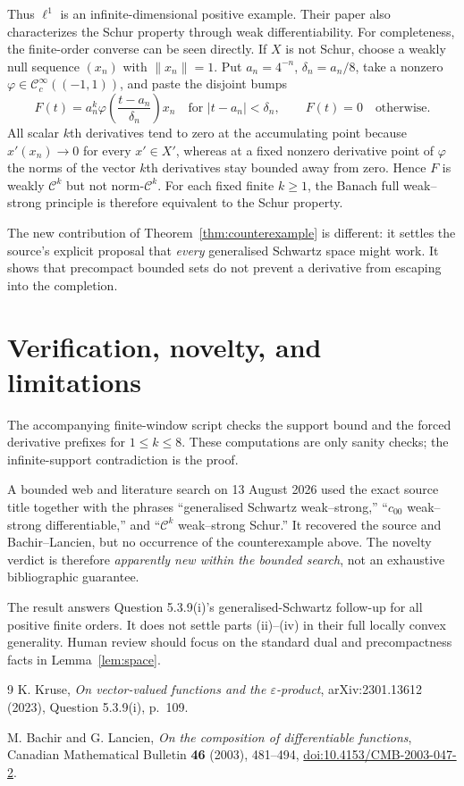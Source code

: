 \documentclass[10pt]{article}
\newcommand{\Ck}{\mathcal C}
\begin{document}
Thus $\ell^1$ is an infinite-dimensional positive example. Their paper also
characterizes the Schur property through weak differentiability. For
completeness, the finite-order converse can be seen directly. If $X$ is not
Schur, choose a weakly null sequence $(x_n)$ with $\|x_n\|=1$. Put
$a_n=4^{-n}$, $\delta_n=a_n/8$, take a nonzero
$\varphi\in\Ck_c^\infty((-1,1))$, and paste the disjoint bumps
\[
 F(t)=a_n^k\varphi\!\left(\frac{t-a_n}{\delta_n}\right)x_n
 \quad\text{for }|t-a_n|<\delta_n,
 \qquad F(t)=0\quad\text{otherwise}.
\]
All scalar $k$th derivatives tend to zero at the accumulating point because
$x'(x_n)\to0$ for every $x'\in X'$, whereas at a fixed nonzero derivative
point of $\varphi$ the norms of the vector $k$th derivatives stay bounded
away from zero. Hence $F$ is weakly $\Ck^k$ but not norm-$\Ck^k$. For each
fixed finite $k\geq1$, the Banach full weak--strong principle is therefore
equivalent to the Schur property.

The new contribution of Theorem~\ref{thm:counterexample} is different: it
settles the source's explicit proposal that \emph{every} generalised Schwartz
space might work. It shows that precompact bounded sets do not prevent a
derivative from escaping into the completion.

\section{Verification, novelty, and limitations}

The accompanying finite-window script checks the support bound and the forced
derivative prefixes for $1\leq k\leq8$. These computations are only sanity
checks; the infinite-support contradiction is the proof.

A bounded web and literature search on 13 August 2026 used the exact source
title together with the phrases ``generalised Schwartz weak--strong,''
``$c_{00}$ weak--strong differentiable,'' and ``$\Ck^k$ weak--strong Schur.''
It recovered the source and Bachir--Lancien, but no occurrence of the
counterexample above. The novelty verdict is therefore \emph{apparently new
within the bounded search}, not an exhaustive bibliographic guarantee.

The result answers Question 5.3.9(i)'s generalised-Schwartz follow-up for all
positive finite orders. It does not settle parts (ii)--(iv) in their full
locally convex generality. Human review should focus on the standard dual and
precompactness facts in Lemma~\ref{lem:space}.

\begin{thebibliography}{9}
K. Kruse,
\emph{On vector-valued functions and the $\varepsilon$-product},
arXiv:2301.13612 (2023), Question 5.3.9(i), p.~109.

M. Bachir and G. Lancien,
\emph{On the composition of differentiable functions},
Canadian Mathematical Bulletin \textbf{46} (2003), 481--494,
\href{https://doi.org/10.4153/CMB-2003-047-2}{doi:10.4153/CMB-2003-047-2}.
\end{thebibliography}
\end{document}
